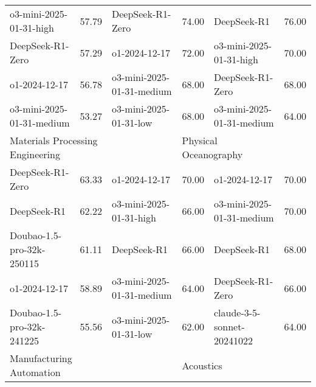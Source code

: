 {\begin{longtable}{p{4.2cm}>{\centering\arraybackslash} p{0.8cm}|p{4.2cm} >{\centering\arraybackslash} p{0.8cm}|p{4.2cm} >{\centering\arraybackslash} p{0.8cm}}
\cellcolor{blue!5} o3-mini-2025-01-31-high & \cellcolor{blue!2}57.79 & \cellcolor{yellow!5} DeepSeek-R1-Zero & \cellcolor{yellow!2} 74.00 & \cellcolor{green!5} DeepSeek-R1 & \cellcolor{green!2} 76.00\\
\cellcolor{blue!5} DeepSeek-R1-Zero & \cellcolor{blue!2}57.29 & \cellcolor{yellow!5} o1-2024-12-17 & \cellcolor{yellow!2} 72.00 & \cellcolor{green!5} o3-mini-2025-01-31-high & \cellcolor{green!2} 70.00\\
\cellcolor{blue!5} o1-2024-12-17 & \cellcolor{blue!2}56.78 & \cellcolor{yellow!5} o3-mini-2025-01-31-medium & \cellcolor{yellow!2} 68.00 & \cellcolor{green!5} DeepSeek-R1-Zero & \cellcolor{green!2} 68.00\\
\cellcolor{blue!5} o3-mini-2025-01-31-medium & \cellcolor{blue!2}53.27 & \cellcolor{yellow!5} o3-mini-2025-01-31-low & \cellcolor{yellow!2} 68.00 & \cellcolor{green!5} o3-mini-2025-01-31-medium & \cellcolor{green!2} 64.00\\
\hline
\multicolumn{2}{p{5.15cm}|}{\cellcolor{blue!10} \centering Materials Processing Engineering} & \multicolumn{2}{p{5.15cm}|}{\cellcolor{yellow!10} \centering Clinical Laboratory Diagnostics} & \multicolumn{2}{p{5.15cm}}{\cellcolor{green!10} \centering Physical Oceanography}\\
\hline
\cellcolor{blue!5} DeepSeek-R1-Zero & \cellcolor{blue!2}63.33 & \cellcolor{yellow!5} o1-2024-12-17 & \cellcolor{yellow!2} 70.00 & \cellcolor{green!5} o1-2024-12-17 & \cellcolor{green!2} 70.00\\
\cellcolor{blue!5} DeepSeek-R1 & \cellcolor{blue!2}62.22 & \cellcolor{yellow!5} o3-mini-2025-01-31-high & \cellcolor{yellow!2} 66.00 & \cellcolor{green!5} o3-mini-2025-01-31-medium & \cellcolor{green!2} 70.00\\
\cellcolor{blue!5} Doubao-1.5-pro-32k-250115 & \cellcolor{blue!2}61.11 & \cellcolor{yellow!5} DeepSeek-R1 & \cellcolor{yellow!2} 66.00 & \cellcolor{green!5} DeepSeek-R1 & \cellcolor{green!2} 68.00\\
\cellcolor{blue!5} o1-2024-12-17 & \cellcolor{blue!2}58.89 & \cellcolor{yellow!5} o3-mini-2025-01-31-medium & \cellcolor{yellow!2} 64.00 & \cellcolor{green!5} DeepSeek-R1-Zero & \cellcolor{green!2} 66.00\\
\cellcolor{blue!5} Doubao-1.5-pro-32k-241225 & \cellcolor{blue!2}55.56 & \cellcolor{yellow!5} o3-mini-2025-01-31-low & \cellcolor{yellow!2} 62.00 & \cellcolor{green!5} claude-3-5-sonnet-20241022 & \cellcolor{green!2} 64.00\\
\hline
\multicolumn{2}{p{5.15cm}|}{\cellcolor{blue!10} \centering Manufacturing Automation} & \multicolumn{2}{p{5.15cm}|}{\cellcolor{yellow!10} \centering Dermatology and Venereology} & \multicolumn{2}{p{5.15cm}}{\cellcolor{green!10} \centering Acoustics}\\

\end{longtable}}
